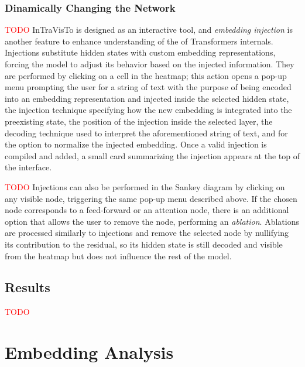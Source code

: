 \documentclass[aspectratio=169, 12pt]{beamer}
\begin{document}
    \subsubsection{Dinamically Changing the Network}
    \begin{frame}{}
        \textcolor{red}{TODO}
        InTraVisTo is designed as an interactive tool, and \emph{embedding injection} is another feature to enhance understanding of the of Transformers internals.
        Injections substitute hidden states with custom embedding representations, forcing the model to adjust its behavior based on the injected information.
        They are performed by clicking on a cell in the heatmap; this action opens a pop-up menu prompting the user for a string of text with the purpose of being encoded into an embedding representation and injected inside the selected hidden state, the injection technique specifying how the new embedding is integrated into the preexisting state, the position of the injection inside the selected layer, the decoding technique used to interpret the aforementioned string of text, and for the option to normalize the injected embedding.
        Once a valid injection is compiled and added, a small card summarizing the injection appears at the top of the interface.
    \end{frame}

    \begin{frame}{}
        \textcolor{red}{TODO}
        Injections can also be performed in the Sankey diagram by clicking on any visible node, triggering the same pop-up menu described above.
        If the chosen node corresponds to a feed-forward or an attention node, there is an additional option that allows the user to remove the node, performing an \emph{ablation}.
        Ablations are processed similarly to injections and remove the selected node by nullifying its contribution to the residual, so its hidden state is still decoded and visible from the heatmap but does not influence the rest of the model.
    \end{frame}

    \subsection{Results}
    \begin{frame}{}
        \textcolor{red}{TODO}
    \end{frame}

    \section{Embedding Analysis}
\end{document}

